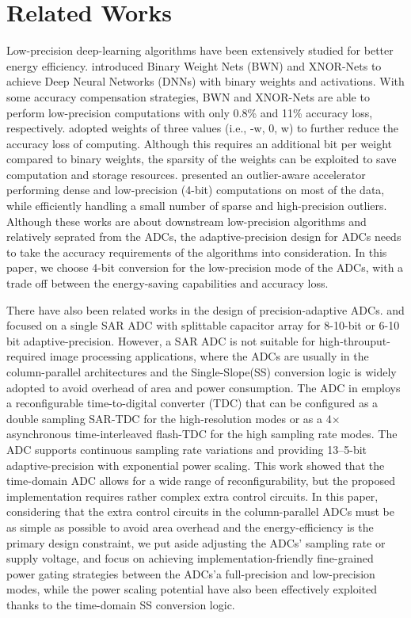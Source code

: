\section{Related Works}\label{related}

Low-precision deep-learning algorithms have been extensively studied\cite{leibe_xnor-net_2016,li_ternary_2016,park_energy-efficient_2018} for better energy efficiency. \cite{leibe_xnor-net_2016} introduced Binary Weight Nets (BWN) and XNOR-Nets to achieve
Deep Neural Networks (DNNs) with binary weights and activations. 
With some accuracy compensation strategies, BWN and XNOR-Nets are able to perform low-precision computations with only 0.8\% and 11\% accuracy loss, respectively.
\cite{li_ternary_2016} adopted weights of three values (i.e., -w, 0, w) to further reduce the accuracy loss of computing. Although this requires an additional bit per weight compared to binary weights, the sparsity of the weights can be exploited to save computation and storage resources.
\cite{park_energy-efficient_2018} presented an outlier-aware accelerator performing dense and low-precision (4-bit) computations on most of the data, while efficiently handling a small number of sparse and high-precision outliers.
Although these works are about downstream low-precision algorithms and relatively seprated from the ADCs, the adaptive-precision design for ADCs needs to take the accuracy requirements of the algorithms into consideration. In this paper, we choose 4-bit conversion for the low-precision mode of the ADCs, with a trade off between the energy-saving capabilities and accuracy loss.

There have also been related works in the design of precision-adaptive ADCs\cite{zhu_06_2013,zhu_6--10-bit_2015,el-halwagy_100-mss5-gss_2018}. \cite{zhu_06_2013} and \cite{zhu_6--10-bit_2015} focused on a single SAR ADC with splittable capacitor array for 8-10-bit or 6-10 bit adaptive-precision.
However, a SAR ADC is not suitable for high-throuput-required image processing applications, where the ADCs are usually in the column-parallel architectures and the Single-Slope(SS)
conversion logic is widely adopted to avoid overhead of area and power consumption.  
The ADC in \cite{el-halwagy_100-mss5-gss_2018} employs a reconfigurable time-to-digital converter (TDC) that can be configured as a double sampling SAR-TDC for the high-resolution modes or as a 4× asynchronous time-interleaved flash-TDC for the high sampling rate modes. The ADC supports continuous sampling rate variations and providing 13–5-bit
adaptive-precision with exponential power scaling. This work showed that the time-domain ADC allows for a wide range of reconfigurability, but the proposed implementation requires rather complex extra control circuits. 
In this paper, considering that the extra control circuits in the column-parallel ADCs must be as simple as possible to avoid area overhead and the energy-efficiency is the primary design constraint, we put aside adjusting the ADCs' sampling rate or supply voltage, and focus on achieving implementation-friendly fine-grained power gating strategies between the ADCs'a full-precision and low-precision modes, while the power scaling potential have also been effectively exploited thanks to the time-domain SS conversion logic.


